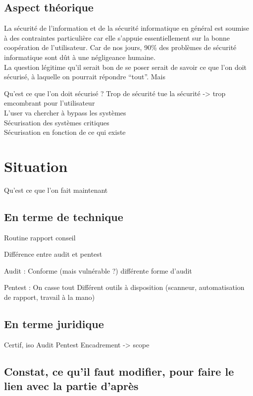 \documentclass[a4paper]{memoir}
\begin{document}
\chapter{Aspect théorique}

La sécurité de l'information et de la sécurité informatique en général est soumise à des contraintes particulière car elle s'appuie essentiellement sur la bonne coopération de l'utilisateur. Car de nos jours, 90\% des problèmes de sécurité informatique sont dût à une négligeance humaine.\\
La question légitime qu'il serait bon de se poser serait de savoir ce que l'on doit sécurisé, à laquelle on pourrait répondre ``tout''. Mais 

Qu'est ce que l'on doit sécurisé ? Trop de sécurité tue la sécurité -> trop emcombrant pour l'utilisateur\\
L'user va chercher à bypass les systèmes\\

Sécurisation des systèmes critiques\\
Sécurisation en fonction de ce qui existe\\ 

\part{Situation}

Qu'est ce que l'on fait maintenant

\chapter{En terme de technique}

Routine
rapport
conseil

Différence entre audit et pentest

Audit : Conforme (mais vulnérable ?)
différente forme d'audit


Pentest : On casse tout
Différent outils à disposition
(scanneur, automatisation de rapport, travail à la mano)

\chapter{En terme juridique}

Certif, iso
Audit
Pentest
Encadrement -> scope

\chapter{Constat, ce qu'il faut modifier, pour faire le lien avec la partie d'après}
\end{document}
